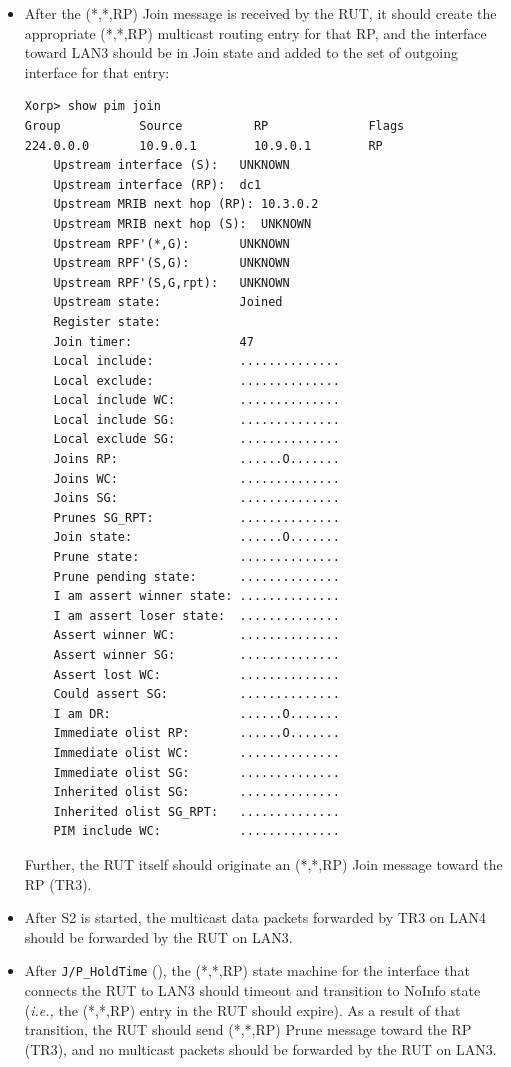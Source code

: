 \documentclass[11pt]{report}
\newcommand{\ie}{\emph{i.e.,}\xspace}
\begin{document}
\begin{itemize}

  \item After the (*,*,RP) Join message is received by the RUT, it
  should create the appropriate (*,*,RP) multicast routing entry for
  that RP, and the interface toward LAN3 should be in Join state and
  added to the set of outgoing interface for that entry:

\begin{verbatim}
Xorp> show pim join 
Group           Source          RP              Flags
224.0.0.0       10.9.0.1        10.9.0.1        RP   
    Upstream interface (S):   UNKNOWN
    Upstream interface (RP):  dc1
    Upstream MRIB next hop (RP): 10.3.0.2
    Upstream MRIB next hop (S):  UNKNOWN
    Upstream RPF'(*,G):       UNKNOWN
    Upstream RPF'(S,G):       UNKNOWN
    Upstream RPF'(S,G,rpt):   UNKNOWN
    Upstream state:           Joined 
    Register state:           
    Join timer:               47
    Local include:            ..............
    Local exclude:            ..............
    Local include WC:         ..............
    Local include SG:         ..............
    Local exclude SG:         ..............
    Joins RP:                 ......O.......
    Joins WC:                 ..............
    Joins SG:                 ..............
    Prunes SG_RPT:            ..............
    Join state:               ......O.......
    Prune state:              ..............
    Prune pending state:      ..............
    I am assert winner state: ..............
    I am assert loser state:  ..............
    Assert winner WC:         ..............
    Assert winner SG:         ..............
    Assert lost WC:           ..............
    Could assert SG:          ..............
    I am DR:                  ......O.......
    Immediate olist RP:       ......O.......
    Immediate olist WC:       ..............
    Immediate olist SG:       ..............
    Inherited olist SG:       ..............
    Inherited olist SG_RPT:   ..............
    PIM include WC:           ..............
\end{verbatim}

  Further, the RUT itself should originate an (*,*,RP) Join message
  toward the RP (TR3).

  \item After S2 is started, the multicast data packets forwarded by TR3
  on LAN4 should be forwarded by the RUT on LAN3.

  \item After \verb=J/P_HoldTime= ({\PimsmJPHoldTime}),
  the (*,*,RP) state machine for the interface that connects the RUT to
  LAN3 should timeout and transition to NoInfo state
  (\ie the (*,*,RP) entry in the RUT should expire).
  As a result of that transition, the RUT should send (*,*,RP) Prune
  message toward the RP (TR3), and no multicast packets should be
  forwarded by the RUT on LAN3.

\end{itemize}
\end{document}
